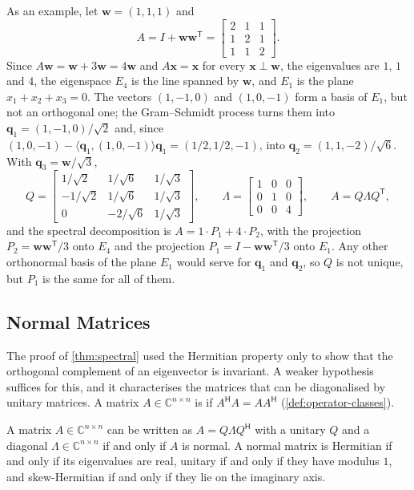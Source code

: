As an example, let $\mathbf w=(1,1,1)$ and
\[
A=I+\mathbf w\mathbf w^{\mathsf T}=\begin{bmatrix}2&1&1\\1&2&1\\1&1&2\end{bmatrix}.
\]
Since $A\mathbf w=\mathbf w+3\mathbf w=4\mathbf w$ and $A\mathbf x=\mathbf x$ for every $\mathbf x\perp\mathbf w$, the eigenvalues are $1$, $1$ and $4$, the eigenspace $E_4$ is the line spanned by $\mathbf w$, and $E_1$ is the plane $x_1+x_2+x_3=0$. The vectors $(1,-1,0)$ and $(1,0,-1)$ form a basis of $E_1$, but not an orthogonal one; the Gram--Schmidt process turns them into $\mathbf q_1=(1,-1,0)/\sqrt2$ and, since $(1,0,-1)-\langle\mathbf q_1,(1,0,-1)\rangle\mathbf q_1=(1/2,1/2,-1)$, into $\mathbf q_2=(1,1,-2)/\sqrt6$. With $\mathbf q_3=\mathbf w/\sqrt3$,
\[
Q=\begin{bmatrix}1/\sqrt2&1/\sqrt6&1/\sqrt3\\-1/\sqrt2&1/\sqrt6&1/\sqrt3\\0&-2/\sqrt6&1/\sqrt3\end{bmatrix},\qquad\Lambda=\begin{bmatrix}1&0&0\\0&1&0\\0&0&4\end{bmatrix},\qquad A=Q\Lambda Q^{\mathsf T},
\]
and the spectral decomposition is $A=1\cdot P_1+4\cdot P_2$, with the projection $P_2=\mathbf w\mathbf w^{\mathsf T}/3$ onto $E_4$ and the projection $P_1=I-\mathbf w\mathbf w^{\mathsf T}/3$ onto $E_1$. Any other orthonormal basis of the plane $E_1$ would serve for $\mathbf q_1$ and $\mathbf q_2$, so $Q$ is not unique, but $P_1$ is the same for all of them.

\subsection{Normal Matrices}

The proof of \cref{thm:spectral} used the Hermitian property only to show that the orthogonal complement of an eigenvector is invariant. A weaker hypothesis suffices for this, and it characterises the matrices that can be diagonalised by unitary matrices. A matrix $A\in\mathbb C^{n\times n}$ is  if $A^{\mathsf H}A=AA^{\mathsf H}$ (\cref{def:operator-classes}).

\begin{theorem}
\label{thm:normal-unitary}
A matrix $A\in\mathbb C^{n\times n}$ can be written as $A=Q\Lambda Q^{\mathsf H}$ with a unitary $Q$ and a diagonal $\Lambda\in\mathbb C^{n\times n}$ if and only if $A$ is normal. A normal matrix is Hermitian if and only if its eigenvalues are real, unitary if and only if they have modulus $1$, and skew-Hermitian if and only if they lie on the imaginary axis.
\end{theorem}

